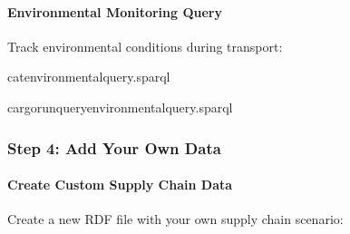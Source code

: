 \documentclass[letterpaper,10pt,english]{sphinxmanual}
\begin{document}
\paragraph{Environmental Monitoring Query}
\label{\detokenize{user-guide/first-steps:environmental-monitoring-query}}
\sphinxAtStartPar
Track environmental conditions during transport:

\begin{sphinxVerbatim}[commandchars=\\\{\}]
cat\PYGZgt{}environmental\PYGZus{}query.sparql


cargorun\PYGZhy{}\PYGZhy{}queryenvironmental\PYGZus{}query.sparql
\end{sphinxVerbatim}


\subsubsection{Step 4: Add Your Own Data}
\label{\detokenize{user-guide/first-steps:step-4-add-your-own-data}}

\paragraph{Create Custom Supply Chain Data}
\label{\detokenize{user-guide/first-steps:create-custom-supply-chain-data}}
\sphinxAtStartPar
Create a new RDF file with your own supply chain scenario:
\end{document}
